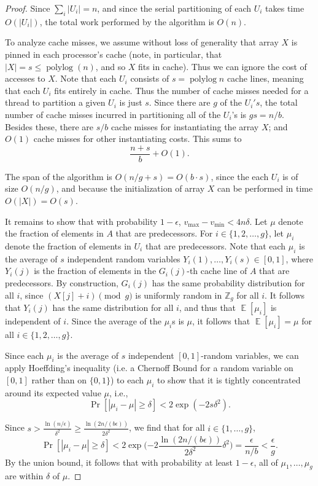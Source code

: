\documentclass[twoside,leqno,twocolumn]{article}
\def\E{\operatorname{\mathbb{E}}}
\newcommand{\polylog}{\operatorname{polylog}}
\begin{document}
\begin{proof}
Since $\sum_i |U_i| = n$, and since the serial partitioning of each $U_i$
takes time $O(|U_i|)$, the total work performed by the algorithm is
$O(n)$.

To analyze cache misses, we assume without loss of generality
that array $X$ is pinned in each processor's cache (note, in
particular, that $|X| = s \le \polylog(n)$, and so $X$ fits in
cache). Thus we can ignore the cost of accesses to $X$. Note that
each $U_i$ consists of $s = \polylog n$ cache lines, meaning that
each $U_i$ fits entirely in cache. Thus the number of cache
misses needed for a thread to partition a given $U_i$ is just
$s$. Since there are $g$ of the $U_i's$, the total number of
cache misses incurred in partitioning all of the $U_i$'s is $g s
= n/b$. Besides these, there are $s/b$ cache misses for
instantiating the array $X$; and $O(1)$ cache misses for other
instantiating costs. This sums to $$\frac{n+s}{b}+O(1).$$

The span of the algorithm is $O(n/g + s) = O(b\cdot s)$, since the
each $U_i$ is of size $O(n / g)$, and because the initialization of
array $X$ can be performed in time $O(|X|) = O(s)$.

It remains to show that with probability $1-\epsilon$, $v_{\text{max}}
- v_{\text{min}} < 4n\delta$. Let $\mu$ denote the fraction of
elements in $A$ that are predecessors. For $i \in \{1, 2, \ldots,
g\}$, let $\mu_i$ denote the fraction of elements in $U_i$ that are
predecessors. Note that each $\mu_i$ is the average of $s$ independent
random variables $Y_i(1), \ldots, Y_i(s) \in [0, 1]$, where $Y_i(j)$
is the fraction of elements in the $G_i(j)$-th cache line of $A$ that
are predecessors. By construction, $G_i(j)$ has the same probability
distribution for all $i$, since $(X[j] + i) \pmod g$ is uniformly
random in $\mathbb{Z}_g$ for all $i$. It follows that $Y_i(j)$ has the
same distribution for all $i$, and thus that $\E[\mu_i]$ is
independent of $i$. Since the average of the $\mu_i$s is $\mu$, it
follows that $\E[\mu_i] = \mu$ for all $i \in \{1, 2, \ldots, g\}$.

Since each $\mu_i$ is the average of $s$ independent $[0, 1]$-random
variables, we can apply Hoeffding's inequality (i.e. a Chernoff Bound
for a random variable on $[0,1]$ rather than on $\{0,1\}$) to each
$\mu_i$ to show that it is tightly concentrated around its expected
value $\mu$, i.e.,
$$\Pr[|\mu_i - \mu| \geq \delta] < 2\exp(-2s\delta^2). $$

Since $s > \frac{\ln (n/\epsilon)}{\delta^2} \ge \frac{\ln (2n / (b\epsilon))}{2\delta^2}$, we find that for all $i \in
\{1,\ldots, g\}$,
$$\Pr[|\mu_i - \mu| \geq \delta] < 2\exp\Big({-2} \frac{\ln
  (2n/(b\epsilon))}{2\delta^2} \delta^2\Big) = \frac{\epsilon}{n/b} <
\frac{\epsilon}{g}. $$ By the union bound, it follows that with
probability at least $1 - \epsilon$, all of $\mu_1, \ldots, \mu_{g}$ are within $\delta$ of $\mu$.


\end{proof}
\end{document}

